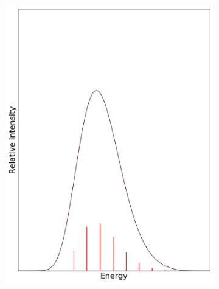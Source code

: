 \documentclass[12pt, fleqn]{beamer}
\begin{document}
\begin{frame}
\begin{overlayarea}{\textwidth}{14cm}
{\begin{figure}[h!]
\begin{subfigure}[b]{0.45\linewidth}
                    \includegraphics[width=\linewidth]{fc_sp/sp_7.png}
                \end{subfigure}
            \end{figure}
        }
\end{overlayarea}
\end{frame}
\end{document}
